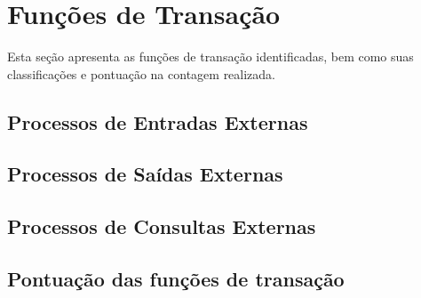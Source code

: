 \vfill
\pagebreak
\section{Funções de Transação}
  
 Esta seção apresenta as funções de transação identificadas, bem como suas classificações e pontuação na contagem realizada.
  
  \subsection{Processos de Entradas Externas}
  
    
  
  \subsection{Processos de Saídas Externas}
    
    

  \subsection{Processos de Consultas Externas}
    
    
    
    
\vfill
\pagebreak
  \subsection{Pontuação das funções de transação}
    
